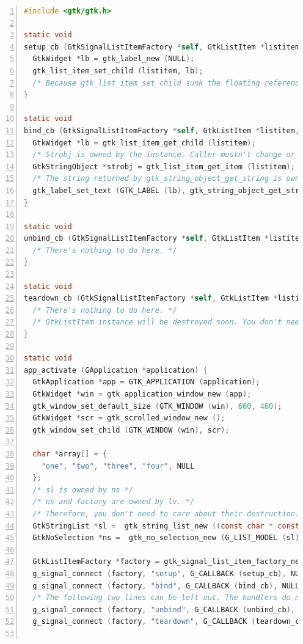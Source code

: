 \begin{lstlisting}[language=C, numbers=left]
#include <gtk/gtk.h>

static void
setup_cb (GtkSignalListItemFactory *self, GtkListItem *listitem, gpointer user_data) {
  GtkWidget *lb = gtk_label_new (NULL);
  gtk_list_item_set_child (listitem, lb);
  /* Because gtk_list_item_set_child sunk the floating reference of lb, releasing (unref) isn't necessary for lb. */
}

static void
bind_cb (GtkSignalListItemFactory *self, GtkListItem *listitem, gpointer user_data) {
  GtkWidget *lb = gtk_list_item_get_child (listitem);
  /* Strobj is owned by the instance. Caller mustn't change or destroy it. */
  GtkStringObject *strobj = gtk_list_item_get_item (listitem);
  /* The string returned by gtk_string_object_get_string is owned by the instance. */
  gtk_label_set_text (GTK_LABEL (lb), gtk_string_object_get_string (strobj));
}

static void
unbind_cb (GtkSignalListItemFactory *self, GtkListItem *listitem, gpointer user_data) {
  /* There's nothing to do here. */
}

static void
teardown_cb (GtkSignalListItemFactory *self, GtkListItem *listitem, gpointer user_data) {
  /* There's nothing to do here. */
  /* GtkListItem instance will be destroyed soon. You don't need to set the child to NULL. */
}

static void
app_activate (GApplication *application) {
  GtkApplication *app = GTK_APPLICATION (application);
  GtkWidget *win = gtk_application_window_new (app);
  gtk_window_set_default_size (GTK_WINDOW (win), 600, 400);
  GtkWidget *scr = gtk_scrolled_window_new ();
  gtk_window_set_child (GTK_WINDOW (win), scr);

  char *array[] = {
    "one", "two", "three", "four", NULL
  };
  /* sl is owned by ns */
  /* ns and factory are owned by lv. */
  /* Therefore, you don't need to care about their destruction. */
  GtkStringList *sl =  gtk_string_list_new ((const char * const *) array);
  GtkNoSelection *ns =  gtk_no_selection_new (G_LIST_MODEL (sl));

  GtkListItemFactory *factory = gtk_signal_list_item_factory_new ();
  g_signal_connect (factory, "setup", G_CALLBACK (setup_cb), NULL);
  g_signal_connect (factory, "bind", G_CALLBACK (bind_cb), NULL);
  /* The following two lines can be left out. The handlers do nothing. */
  g_signal_connect (factory, "unbind", G_CALLBACK (unbind_cb), NULL);
  g_signal_connect (factory, "teardown", G_CALLBACK (teardown_cb), NULL);


\end{lstlisting}
